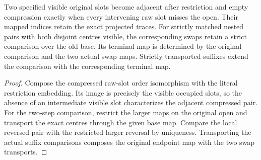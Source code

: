 \begin{proposition}
\label{hir:g8-matched-visible-swaps}
\leanok
Two specified visible original slots become adjacent after restriction
and empty compression exactly when every intervening raw slot misses
the open. Their mapped indices retain the exact projected traces.
For strictly matched nested pairs with both disjoint centres visible,
the corresponding swaps retain a strict comparison over the old base.
Its terminal map is determined by the original comparison and the two
actual swap maps. Strictly transported suffixes extend the comparison
with the corresponding terminal map.
\end{proposition}
\begin{proof}
Compose the compressed raw-slot order isomorphism with the literal
restriction embedding. Its image is precisely the visible occupied
slots, so the absence of an intermediate visible slot characterizes
the adjacent compressed pair. For the two-step comparison, restrict
the larger maps on the original open and transport the exact centres
through the given base map. Compare the local reversed pair with the
restricted larger reversal by uniqueness. Transporting the actual
suffix comparisons composes the original endpoint map with the two
swap transports.
\end{proof}

